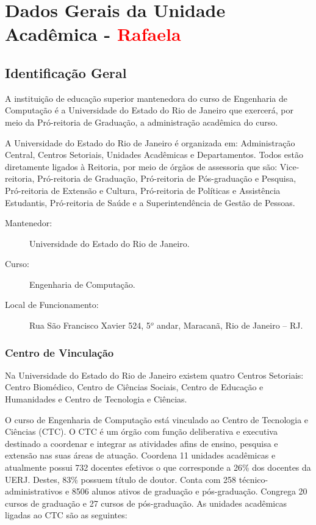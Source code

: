 \chapter{Dados Gerais da Unidade Acadêmica - \textcolor{red}{Rafaela}}


\section{Identificação Geral}

A instituição de educação superior mantenedora do curso de Engenharia de Computação é a Universidade do Estado do Rio de Janeiro que exercerá, por meio da Pró-reitoria de Graduação, a administração acadêmica do curso.

A Universidade do Estado do Rio de Janeiro é organizada em: Administração Central, Centros Setoriais, Unidades Acadêmicas e Departamentos. Todos estão diretamente ligados à Reitoria, por meio de órgãos de assessoria que são: Vice-reitoria, Pró-reitoria de Graduação, Pró-reitoria de Pós-graduação e Pesquisa, Pró-reitoria de Extensão e Cultura, Pró-reitoria de Políticas e Assistência Estudantis, Pró-reitoria de Saúde e a Superintendência de Gestão de Pessoas.


\begin{description}
	\item[Mantenedor:] Universidade do Estado do Rio de Janeiro.
	\item [Curso:] Engenharia de Computação.
	\item [Local de Funcionamento:] Rua São Francisco Xavier 524, 5$^{o}$ andar, Maracanã, Rio de Janeiro -- RJ.
\end{description}

\subsection{Centro de Vinculação}

Na Universidade do Estado do Rio de Janeiro existem quatro Centros Setoriais: Centro Biomédico, Centro de Ciências Sociais, Centro de Educação e Humanidades e Centro de Tecnologia e Ciências.

O curso de Engenharia de Computação está vinculado ao Centro de Tecnologia e Ciências (CTC).
O CTC é um órgão com função deliberativa e executiva destinado a coordenar e integrar as atividades afins de ensino, pesquisa e extensão nas suas áreas de atuação. Coordena 11 unidades acadêmicas e atualmente possui 732 docentes efetivos o que corresponde a 26\% dos docentes da UERJ. Destes, 83\% possuem título de doutor. Conta com 258 técnico-administrativos e 8506 alunos ativos de graduação e pós-graduação. Congrega 20 cursos de graduação e 27 cursos de pós-graduação. As unidades acadêmicas ligadas ao CTC são as seguintes:

